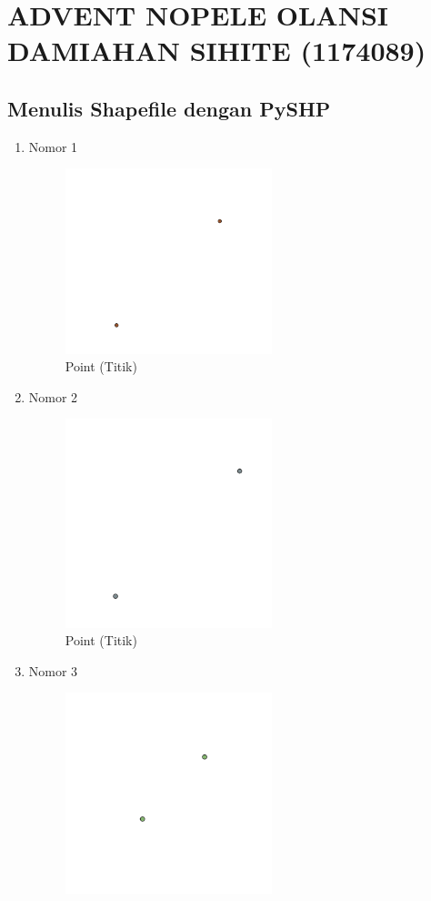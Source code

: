 \section{ADVENT NOPELE OLANSI DAMIAHAN SIHITE (1174089)}
\subsection{Menulis Shapefile dengan PySHP}
\begin{enumerate}
	\item Nomor 1
	
	\begin{figure}[H]
		\includegraphics[width=6cm]{figures/Tugas2/1174089/1.PNG}
		\centering
		\caption{Point (Titik)}
	\end{figure}
	\item Nomor 2
	
	\begin{figure}[H]
		\includegraphics[width=6cm]{figures/Tugas2/1174089/2.PNG}
		\centering
		\caption{Point (Titik)}
	\end{figure}
	\item Nomor 3
	
	\begin{figure}[H]
		\includegraphics[width=6cm]{figures/Tugas2/1174089/3.PNG}

\end{figure}
\end{enumerate}
